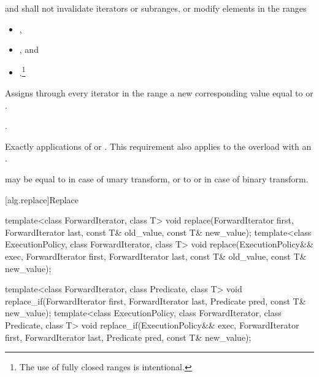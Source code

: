 \begin{itemdescr}
\pnum
\requires
{} and 
shall not invalidate iterators or subranges, or modify elements in the ranges
\begin{itemize}
\item {},
\item {}, and
\item {}.\footnote{The use of fully
closed ranges is intentional.}
\end{itemize}

\pnum
\effects
Assigns through every iterator
in the range
a new
corresponding value equal to
or
.

\pnum
\returns
{}.

\pnum
\complexity
Exactly
applications of
 or .  This requirement also applies to the overload
with an  .

\pnum
\remarks
{} may be equal to 
in case of unary transform,
or to  or 
in case of binary transform.
\end{itemdescr}

[alg.replace]{Replace}

%
%
\begin{itemdecl}
template<class ForwardIterator, class T>
  void replace(ForwardIterator first, ForwardIterator last,
               const T& old_value, const T& new_value);
template<class ExecutionPolicy, class ForwardIterator, class T>
  void replace(ExecutionPolicy&& exec,
               ForwardIterator first, ForwardIterator last,
               const T& old_value, const T& new_value);

template<class ForwardIterator, class Predicate, class T>
  void replace_if(ForwardIterator first, ForwardIterator last,
                  Predicate pred, const T& new_value);
template<class ExecutionPolicy, class ForwardIterator, class Predicate, class T>
  void replace_if(ExecutionPolicy&& exec,
                  ForwardIterator first, ForwardIterator last,
                  Predicate pred, const T& new_value);
\end{itemdecl}


